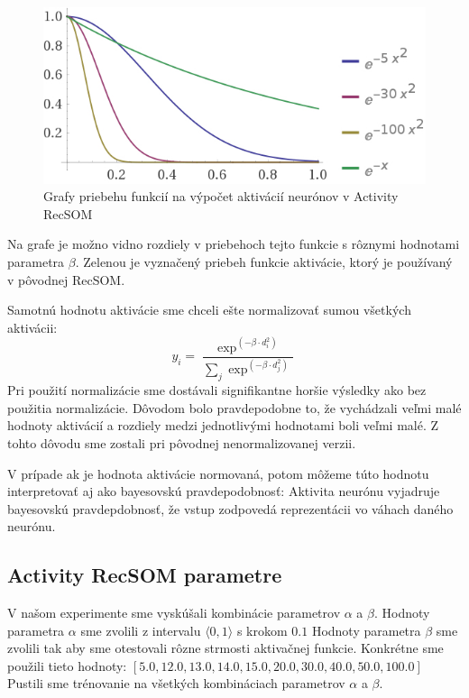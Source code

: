 \begin{figure}[H]
    \centering
    \includegraphics[width=\textwidth]{assets/plots}
    \caption{Grafy priebehu funkcií na výpočet aktivácií neurónov v Activity RecSOM}
\end{figure}
Na grafe je možno vidno rozdiely v priebehoch tejto funkcie s rôznymi hodnotami parametra $\beta$. Zelenou 
je vyznačený priebeh funkcie aktivácie, ktorý je používaný v pôvodnej RecSOM.

Samotnú hodnotu aktivácie sme chceli ešte normalizovať sumou všetkých aktivácii:
\begin{equation}
    y_{i} = \frac{\exp^{(-\beta \cdot d_{i}^{2})}}{\sum_{j} \exp^{(-\beta \cdot d_{j}^{2})}}
\end{equation}
Pri použití normalizácie sme dostávali signifikantne horšie výsledky
ako bez použitia normalizácie. Dôvodom bolo pravdepodobne to, že vychádzali veľmi malé
hodnoty aktivácií a rozdiely medzi jednotlivými hodnotami boli veľmi malé. Z tohto dôvodu sme zostali 
pri pôvodnej nenormalizovanej verzii.

V prípade ak je hodnota aktivácie normovaná, potom môžeme túto
hodnotu interpretovať aj ako bayesovskú pravdepodobnosť:
Aktivita neurónu vyjadruje bayesovskú pravdepdobnosť, že vstup zodpovedá reprezentácii vo váhach daného neurónu.

\subsection{Activity RecSOM parametre}
V našom experimente sme vyskúšali kombinácie parametrov $\alpha$ a $\beta$.
Hodnoty parametra $\alpha$ sme zvolili z intervalu $\langle0, 1\rangle$ s krokom $0.1$
Hodnoty parametra $\beta$ sme zvolili tak aby sme otestovali rôzne strmosti aktivačnej funkcie.
Konkrétne sme použili tieto hodnoty: $[5.0, 12.0, 13.0, 14.0, 15.0, 20.0, 30.0, 40.0, 50.0, 100.0]$
Pustili sme trénovanie na všetkých kombináciach parametrov $\alpha$ a $\beta$.

